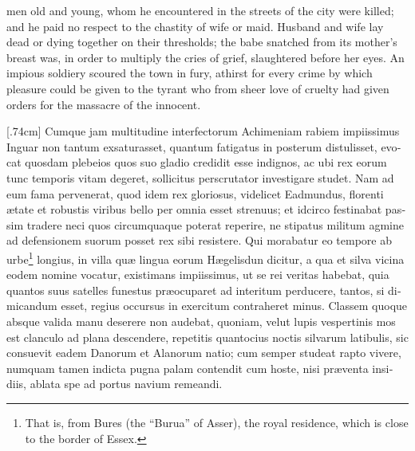 \documentclass[10pt]{book}
\begin{document}
\vspace{-2\parskip}
\vspace{-3\lineskip}
men old and young, whom he encountered in the streets of the city were killed; and he paid no respect to the chastity of wife or maid. Husband and wife lay dead or dying together on their thresholds; the babe snatched from its mother's breast was, in order to multiply the cries of grief, slaughtered before her eyes. An impious soldiery scoured the town in fury, athirst for every crime by which pleasure could be given to the tyrant who from sheer love of cruelty had given orders for the massacre of the innocent.

\begin{paracol}{2}

\begin{otherlanguage}{latin}
\reversemarginpar
{}[.74cm]
Cumque jam multitudine interfectorum Achimeniam rabiem impiissimus Inguar non tantum exsaturasset, quantum fatigatus in posterum distulisset, evocat quosdam plebeios quos suo gladio credidit esse indignos, ac ubi rex eorum tunc temporis vitam degeret, sollicitus perscrutator investigare studet. Nam ad eum fama pervenerat, quod idem rex gloriosus, videlicet Eadmundus, florenti \ae{}tate et robustis viribus bello per omnia esset strenuus; et idcirco festinabat passim tradere neci quos circumquaque poterat reperire, ne stipatus militum agmine ad defensionem suorum posset rex sibi resistere. Qui morabatur eo tempore ab urbe\footnote[\textdagger]{That is, from Bures (the ``Burua'' of Asser), the royal residence, which is close to the border of Essex.} longius, in villa qu\ae{} lingua eorum H\ae{}gelisdun dicitur, a qua et silva vicina eodem nomine vocatur, existimans impiissimus, ut se rei veritas habebat, quia quantos suus satelles funestus pr\ae{}ocuparet ad interitum perducere, tantos, si dimicandum esset, regius occursus in exercitum contraheret minus. Classem quoque absque valida manu deserere non audebat, quoniam, velut lupis vespertinis mos est clanculo ad plana descendere, repetitis quantocius noctis silvarum latibulis, sic consuevit eadem Danorum et Alanorum natio; cum semper studeat rapto vivere, numquam tamen indicta pugna palam contendit cum hoste, nisi pr\ae{}venta insidiis, ablata spe ad portus navium remeandi.
\end{otherlanguage}

\switchcolumn


\end{paracol}
\end{document}
